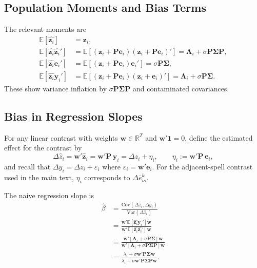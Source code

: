 \documentclass[sigconf,nonacm]{acmart}
\newcommand{\Var}{\text{Var}}
\newcommand{\Cov}{\text{Cov}}
\begin{document}
\subsection{Population Moments and Bias Terms}

The relevant moments are
\begin{align}
  \mathbb E[\hat{\mathbf z_i}] &= \mathbf z_i,\\
  \mathbb E[\hat{\mathbf z_i}\hat{\mathbf z_i}'] &= 
\mathbb E[(\mathbf z_i + \mathbf P\mathbf e_i)(\mathbf z_i + \mathbf P\mathbf e_i)' ] =
    \mathbf \Lambda_i + \sigma\mathbf P\mathbf\Sigma\mathbf P,\\ 
  \mathbb E[\hat{\mathbf z_i}\mathbf e_i'] &= 
\mathbb E[(\mathbf z_i + \mathbf P\mathbf e_i)\mathbf e_i' ] = \sigma\mathbf P\mathbf\Sigma,\\
  \mathbb E[\hat{\mathbf z_i}\mathbf y_i'] &= 
\mathbb E[(\mathbf z_i + \mathbf P\mathbf e_i)(\mathbf z_i + \mathbf e_i)' ] = \mathbf \Lambda_i + \sigma\mathbf P\mathbf\Sigma.
\end{align}
These show variance inflation by $\sigma\mathbf P\mathbf\Sigma\mathbf P$ and contaminated covariances.

\subsection{Bias in Regression Slopes}

For any linear contrast with weights $\mathbf w\in\mathbb R^T$ and $\mathbf w'\mathbf 1=0$, define the estimated effect for the contrast by
$$
\Delta\hat z_i = \mathbf w'\hat{\mathbf z}_i = \mathbf w'\mathbf P\,\mathbf y_i = \Delta z_i + \eta_i,\qquad \eta_i:=\mathbf w'\mathbf P\,\mathbf e_i,
$$
and recall that $\Delta y_i = \Delta z_i + \varepsilon_i$ where $\varepsilon_i=\mathbf w'\mathbf e_i$. 
For the adjacent-spell contrast used in the main text, $\eta_i$ corresponds to $\Delta\bar e_{is}^{k}$.

The naive regression slope is
\begin{equation}
\begin{aligned}
\hat\beta
&=
  \frac {\Cov(\Delta \hat z_i, \Delta y_i)}
        {\Var(\Delta \hat z_i)}\\
&=
  \frac {\mathbf w' \mathbb E[\hat{\mathbf z_i}\mathbf y_i ']\mathbf w}
        {\mathbf w' \mathbb E[\hat{\mathbf z_i}\hat{\mathbf z_i}']\mathbf w}\\
&=
  \frac {\mathbf w' [\mathbf \Lambda_i + \sigma \mathbf P\mathbf\Sigma]\mathbf w}
        {\mathbf w' [\mathbf \Lambda_i + \sigma \mathbf P\mathbf\Sigma\mathbf P]\mathbf w}\\
&=
  \frac {\lambda_i + \sigma \mathbf w' \mathbf P\mathbf\Sigma \mathbf w}
        {\lambda_i + \sigma \mathbf w' \mathbf P\mathbf\Sigma \mathbf P \mathbf w}.
\end{aligned}
\end{equation}
\end{document}
